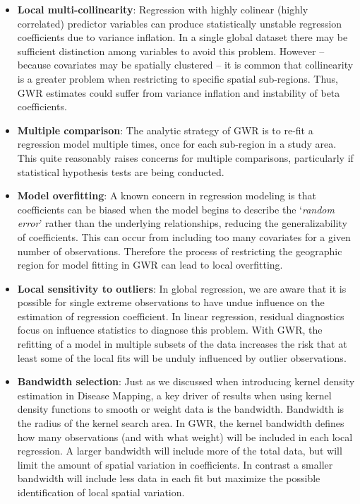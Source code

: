 \documentclass[
]{book}
\providecommand{\tightlist}{%
  \setlength{\itemsep}{0pt}\setlength{\parskip}{0pt}}
\begin{document}
\begin{itemize}
\tightlist
\item
  \textbf{Local multi-collinearity}: Regression with highly colinear (highly correlated) predictor variables can produce statistically unstable regression coefficients due to variance inflation. In a single global dataset there may be sufficient distinction among variables to avoid this problem. However -- because covariates may be spatially clustered -- it is common that collinearity is a greater problem when restricting to specific spatial sub-regions. Thus, GWR estimates could suffer from variance inflation and instability of beta coefficients.
\item
  \textbf{Multiple comparison}: The analytic strategy of GWR is to re-fit a regression model multiple times, once for each sub-region in a study area. This quite reasonably raises concerns for multiple comparisons, particularly if statistical hypothesis tests are being conducted.
\item
  \textbf{Model overfitting}: A known concern in regression modeling is that coefficients can be biased when the model begins to describe the `\emph{random error}' rather than the underlying relationships, reducing the generalizability of coefficients. This can occur from including too many covariates for a given number of observations. Therefore the process of restricting the geographic region for model fitting in GWR can lead to local overfitting.
\item
  \textbf{Local sensitivity to outliers}: In global regression, we are aware that it is possible for single extreme observations to have undue influence on the estimation of regression coefficient. In linear regression, residual diagnostics focus on influence statistics to diagnose this problem. With GWR, the refitting of a model in multiple subsets of the data increases the risk that at least some of the local fits will be unduly influenced by outlier observations.
\item
  \textbf{Bandwidth selection}: Just as we discussed when introducing kernel density estimation in Disease Mapping, a key driver of results when using kernel density functions to smooth or weight data is the bandwidth. Bandwidth is the radius of the kernel search area. In GWR, the kernel bandwidth defines how many observations (and with what weight) will be included in each local regression. A larger bandwidth will include more of the total data, but will limit the amount of spatial variation in coefficients. In contrast a smaller bandwidth will include less data in each fit but maximize the possible identification of local spatial variation.
\end{itemize}
\end{document}

